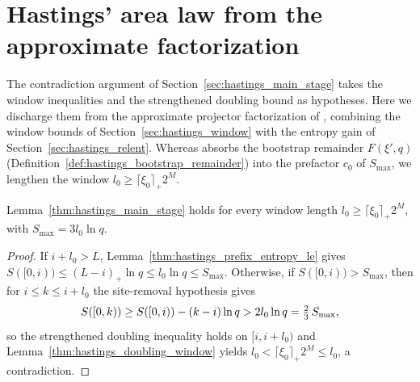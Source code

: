 \section{Hastings' area law from the approximate factorization}
\label{sec:hastings_area_law}


The contradiction argument of Section~\ref{sec:hastings_main_stage} takes the
window inequalities and the strengthened doubling bound as hypotheses. Here we
discharge them from the approximate projector factorization of
\cite[Lemma~1]{Hastings2007AreaLaw}, combining the window bounds of
Section~\ref{sec:hastings_window} with the entropy gain of
Section~\ref{sec:hastings_relent}. Whereas
\cite[lines 483--486]{Hastings2007AreaLaw} absorbs the bootstrap remainder
$F(\xi',q)$ (Definition~\ref{def:hastings_bootstrap_remainder}) into the
prefactor $c_0$ of $S_{\max}$, we lengthen the window $l_0\ge\lceil\xi_0\rceil_+2^M$.

\begin{lemma}
    \label{thm:hastings_main_stage_long_window}
    \leanok
    Lemma~\ref{thm:hastings_main_stage} holds for every window length
    $l_0\ge\lceil\xi_0\rceil_+2^M$, with $S_{\max}=3l_0\ln q$.
\end{lemma}
\begin{proof}\leanok
    If $i+l_0>L$, Lemma~\ref{thm:hastings_prefix_entropy_le} gives
    $S(\lbrack0,i))\le(L-i)_+\ln q\le l_0\ln q\le S_{\max}$. Otherwise, if
    $S(\lbrack0,i))>S_{\max}$, then for $i\le k\le i+l_0$ the site-removal
    hypothesis gives
    \begin{align}
        S(\lbrack0,k))\ge S(\lbrack0,i))-(k-i)\ln q>2l_0\ln q=\tfrac23\,S_{\max},
        \notag
    \end{align}
    so the strengthened doubling inequality holds on $[i,i+l_0)$ and
    Lemma~\ref{thm:hastings_doubling_window} yields
    $l_0<\lceil\xi_0\rceil_+2^M\le l_0$, a contradiction.
\end{proof}

